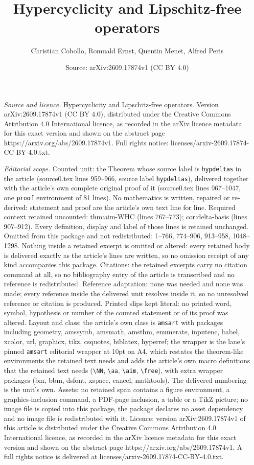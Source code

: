 \documentclass[10pt,a4paper]{amsart}
\title[Hypercyclicity and Lipschitz-free operators]{Hypercyclicity and Lipschitz-free operators}
\author{Christian Cobollo, Romuald Ernst, Quentin Menet, Alfred Peris}
\date{Source: arXiv:2609.17874v1 (CC BY 4.0)}
\begin{document}
\maketitle

\noindent\emph{Source and licence.} Hypercyclicity and Lipschitz-free operators. Version arXiv:2609.17874v1 (CC BY 4.0), distributed under the Creative Commons Attribution 4.0 International licence, as recorded in the arXiv licence metadata for this exact version and shown on the abstract page https://arxiv.org/abs/2609.17874v1. Full rights notice: licenses/arxiv-2609.17874-CC-BY-4.0.txt.\par\smallskip

\noindent\textit{Editorial scope.} Counted unit: the Theorem whose source label is \texttt{hypdeltas} in the article (source0.tex lines 959--966, source label \texttt{hypdeltas}), delivered together with the article's own complete original proof of it (source0.tex lines 967--1047, one \texttt{proof} environment of 81 lines). No mathematics is written, repaired or re-derived: statement and proof are the article's own text line for line. Required context retained uncounted: thm:aim-WHC (lines 767--773); cor:delta-basis (lines 907--912). Every definition, display and label of those lines is retained unchanged. Omitted from this package and not redistributed: 1--766, 774--906, 913--958, 1048--1298. Nothing inside a retained excerpt is omitted or altered: every retained body is delivered exactly as the article's lines are written, so no omission receipt of any kind accompanies this package. Citations: the retained excerpts carry no citation command at all, so no bibliography entry of the article is transcribed and no reference is redistributed. Reference adaptation: none was needed and none was made; every reference inside the delivered unit resolves inside it, so no unresolved reference or citation is produced. Printed slips kept literal: no printed word, symbol, hypothesis or number of the counted statement or of its proof was altered. Layout and class: the article's own class is \texttt{amsart} with packages including geometry, amssymb, amsmath, amsthm, enumerate, inputenc, babel, xcolor, url, graphicx, tikz, csquotes, biblatex, hyperref; the wrapper is the lane's pinned \texttt{amsart} editorial wrapper at 10pt on A4, which restates the theorem-like environments the retained text needs and adds the article's own macro definitions that the retained text needs (\texttt{\textbackslash NN}, \texttt{\textbackslash aa}, \texttt{\textbackslash aim}, \texttt{\textbackslash free}), with extra wrapper packages (bm, bbm, dsfont, xspace, cancel, mathtools). The delivered numbering is the unit's own. Assets: no retained span contains a figure environment, a graphics-inclusion command, a PDF-page inclusion, a table or a TikZ picture; no image file is copied into this package, the package declares no asset dependency and no image file is redistributed with it. Licence: version arXiv:2609.17874v1 of this article is distributed under the Creative Commons Attribution 4.0 International licence, as recorded in the arXiv licence metadata for this exact version and shown on the abstract page https://arxiv.org/abs/2609.17874v1. A full rights notice is delivered at licenses/arxiv-2609.17874-CC-BY-4.0.txt. 
\end{document}
